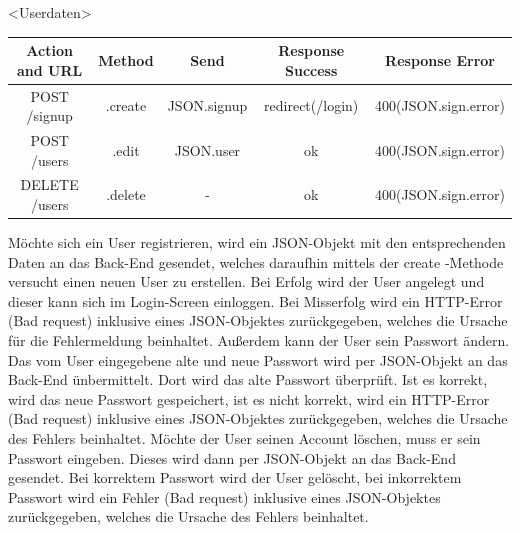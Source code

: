 \newpage
\begin{interface}{20}{<Userdaten>}

\begin{center}
	\begin{tabular}[h]{|c|c|c|c|c|}
	\hline
	\textbf{Action and URL} &\textbf {Method} &\textbf {Send} &\textbf {Response Success} & \textbf{Response Error}\\
	\hline
	POST     /signup & .create & JSON.signup & redirect(/login) & 400(JSON.sign.error)\\
	\hline
	POST     /users & .edit & JSON.user & ok & 400(JSON.sign.error)\\
	\hline
	DELETE     /users & .delete & - & ok & 400(JSON.sign.error)\\
	\hline
	 \end{tabular}
\end{center}

\end{interface}

Möchte sich ein User registrieren, wird ein JSON-Objekt mit den entsprechenden Daten an das Back-End gesendet, welches daraufhin mittels der \glqq create \grqq -Methode versucht einen neuen User zu erstellen. Bei Erfolg wird der User angelegt und dieser kann sich im Login-Screen einloggen. Bei Misserfolg wird ein HTTP-Error (Bad request) inklusive eines JSON-Objektes zurückgegeben, welches die Ursache für die Fehlermeldung beinhaltet.
Außerdem kann der User sein Passwort ändern. Das vom User eingegebene alte und neue Passwort wird per JSON-Objekt an das Back-End ünbermittelt. Dort wird das alte Passwort überprüft. Ist es korrekt, wird das neue Passwort gespeichert, ist es nicht korrekt, wird ein HTTP-Error (Bad request) inklusive eines JSON-Objektes zurückgegeben, welches die Ursache des Fehlers beinhaltet.
Möchte der User seinen Account löschen, muss er sein Passwort eingeben. Dieses wird dann per JSON-Objekt an das Back-End gesendet. Bei korrektem Passwort wird der User gelöscht, bei inkorrektem Passwort wird ein Fehler (Bad request) inklusive eines JSON-Objektes zurückgegeben, welches die Ursache des Fehlers beinhaltet.

